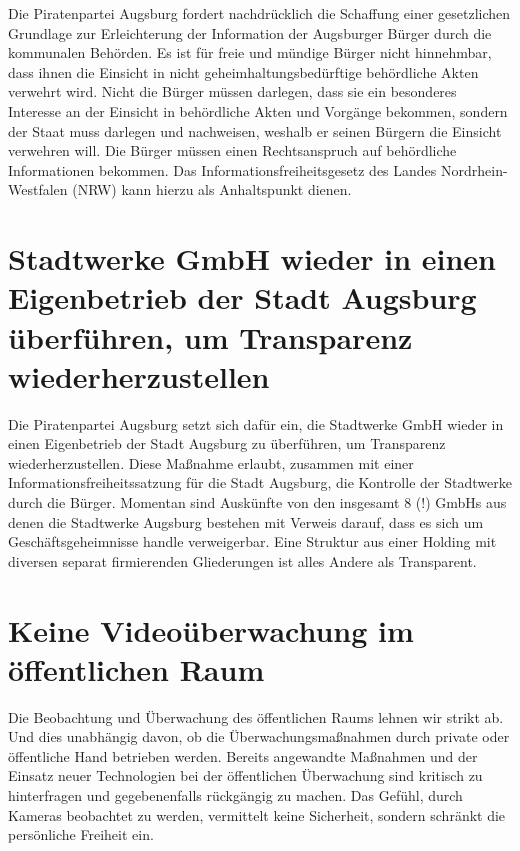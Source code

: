   Die Piratenpartei Augsburg fordert nachdrücklich die Schaffung einer 
  gesetzlichen Grundlage zur Erleichterung der Information der Augsburger 
  Bürger durch die kommunalen Behörden. Es ist für freie und mündige Bürger 
  nicht hinnehmbar, dass ihnen die Einsicht in nicht geheimhaltungsbedürftige 
  behördliche Akten verwehrt wird. Nicht die Bürger müssen darlegen, dass sie 
  ein besonderes Interesse an der Einsicht in behördliche Akten und Vorgänge 
  bekommen, sondern der Staat muss darlegen und nachweisen, weshalb er seinen 
  Bürgern die Einsicht verwehren will. Die Bürger müssen einen Rechtsanspruch 
  auf behördliche Informationen bekommen. Das Informationsfreiheitsgesetz des 
  Landes Nordrhein-Westfalen (NRW) kann hierzu als Anhaltspunkt dienen.
  
  \section{Stadtwerke GmbH wieder in einen Eigenbetrieb der Stadt Augsburg 
  überführen, um Transparenz wiederherzustellen}
  
  Die Piratenpartei Augsburg setzt sich dafür ein, die Stadtwerke GmbH wieder 
  in einen Eigenbetrieb der Stadt Augsburg zu überführen, um Transparenz 
  wiederherzustellen. Diese Maßnahme erlaubt, zusammen mit einer 
  Informationsfreiheitssatzung für die Stadt Augsburg, die Kontrolle der 
  Stadtwerke durch die Bürger. Momentan sind Auskünfte von den insgesamt 8 (!) 
  GmbHs aus denen die Stadtwerke Augsburg bestehen mit Verweis darauf, dass es 
  sich um Geschäftsgeheimnisse handle verweigerbar. Eine Struktur aus einer 
  Holding mit diversen separat firmierenden Gliederungen ist alles Andere als 
  Transparent.
  
  \section{Keine Videoüberwachung im öffentlichen Raum}
  
  Die Beobachtung und Überwachung des öffentlichen Raums lehnen wir strikt ab. 
  Und dies unabhängig davon, ob die Überwachungsmaßnahmen durch private oder 
  öffentliche Hand betrieben werden. Bereits angewandte Maßnahmen und der 
  Einsatz neuer Technologien bei der öffentlichen Überwachung sind kritisch zu 
  hinterfragen und gegebenenfalls rückgängig zu machen. Das Gefühl, durch 
  Kameras beobachtet zu werden, vermittelt keine Sicherheit, sondern schränkt 
  die persönliche Freiheit ein.
  
